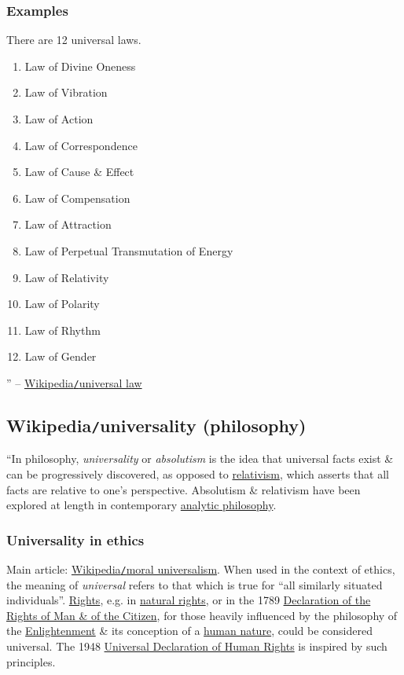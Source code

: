 \documentclass{article}
\begin{document}
\subsubsection{Examples}
There are 12 universal laws.
\begin{enumerate}
	\item Law of Divine Oneness
	\item Law of Vibration
	\item Law of Action
	\item Law of Correspondence
	\item Law of Cause \& Effect
	\item Law of Compensation
	\item Law of Attraction
	\item Law of Perpetual Transmutation of Energy
	\item Law of Relativity
	\item Law of Polarity
	\item Law of Rhythm
	\item Law of Gender
\end{enumerate}
'' -- \href{https://en.wikipedia.org/wiki/Universal_law}{Wikipedia{\tt/}universal law}


\subsection{Wikipedia{\tt/}universality (philosophy)}
``In philosophy, {\it universality} or {\it absolutism} is the idea that universal facts exist \& can be progressively discovered, as opposed to \href{https://en.wikipedia.org/wiki/Relativism}{relativism}, which asserts that all facts are relative to one's perspective. Absolutism \& relativism have been explored at length in contemporary \href{https://en.wikipedia.org/wiki/Analytic_philosophy}{analytic philosophy}.

\subsubsection{Universality in ethics}
Main article: \href{https://en.wikipedia.org/wiki/Moral_universalism}{Wikipedia{\tt/}moral universalism}. When used in the context of ethics, the meaning of {\it universal} refers to that which is true for ``all similarly situated individuals''. \href{https://en.wikipedia.org/wiki/Rights}{Rights}, e.g. in \href{https://en.wikipedia.org/wiki/Natural_rights}{natural rights}, or in the 1789 \href{https://en.wikipedia.org/wiki/Declaration_of_the_Rights_of_Man_and_of_the_Citizen}{Declaration of the Rights of Man \& of the Citizen}, for those heavily influenced by the philosophy of the \href{https://en.wikipedia.org/wiki/Age_of_Enlightenment}{Enlightenment} \& its conception of a \href{https://en.wikipedia.org/wiki/Human_nature}{human nature}, could be considered universal. The 1948 \href{https://en.wikipedia.org/wiki/Universal_Declaration_of_Human_Rights}{Universal Declaration of Human Rights} is inspired by such principles.
\end{document}
